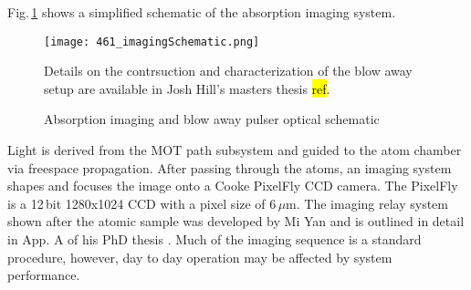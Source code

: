 Fig.\,\ref{fig:absImagingSchematic} shows a simplified schematic of the absorption imaging system.
	\begin{figure} 
		\centerline{
		\texttt{[image: 461\_imagingSchematic.png]}}
		\caption{Absorption imaging and blow away pulser optical schematic}{Details on the contrsuction and characterization of the blow away setup are available in Josh Hill's masters thesis \hl{ref}.}
		\label{fig:absImagingSchematic}
	\end{figure}
Light is derived from the MOT path subsystem and guided to the atom chamber via freespace propagation. 
After passing through the atoms, an imaging system shapes and focuses the image onto a Cooke PixelFly CCD camera.
The PixelFly is a 12\,bit 1280x1024 CCD with a pixel size of 6\,$\mu$m.
The imaging relay system shown after the atomic sample was developed by Mi Yan and is outlined in detail in App. A of his PhD thesis \cite{Yan2013d}. 
Much of the imaging sequence is a standard procedure, however, day to day operation may be affected by system performance.




